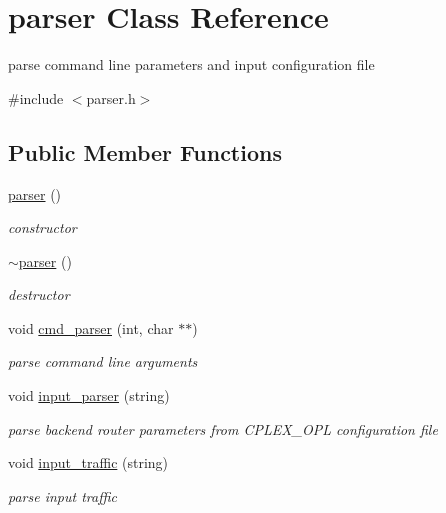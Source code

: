 \hypertarget{classparser}{
\section{parser Class Reference}
\label{classparser}
}


parse command line parameters and input configuration file  




{\ttfamily \#include $<$parser.h$>$}

\subsection*{Public Member Functions}
\begin{DoxyCompactItemize}
\item 
\hyperlink{classparser_ac4cb16e924a735dfb5837772afa1a1a9}{parser} ()
\begin{DoxyCompactList}\small\item\em constructor \item\end{DoxyCompactList}\item 
\hyperlink{classparser_acdd4eb1b51b876954c2f7605f65388ce}{$\sim$parser} ()
\begin{DoxyCompactList}\small\item\em destructor \item\end{DoxyCompactList}\item 
void \hyperlink{classparser_ac578bbb7b49c579bc4520a806fb316c5}{cmd\_\-parser} (int, char $\ast$$\ast$)
\begin{DoxyCompactList}\small\item\em parse command line arguments \item\end{DoxyCompactList}\item 
void \hyperlink{classparser_a4bcf9f11cfbb793a414221fafd4c4a7d}{input\_\-parser} (string)
\begin{DoxyCompactList}\small\item\em parse backend router parameters from CPLEX\_\-OPL configuration file \item\end{DoxyCompactList}\item 
void \hyperlink{classparser_a30a37d82f9894b3c725e2dd1daa0234f}{input\_\-traffic} (string)
\begin{DoxyCompactList}\small\item\em parse input traffic \item\end{DoxyCompactList}\item 
$$
\end{DoxyCompactItemize}

